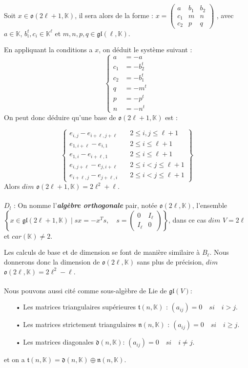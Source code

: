 \documentclass[a4paper,openany,12pt]{report}
\newcommand{\KK}{\mathbb{K}}
\newcommand{\gl}{\mathfrak{gl}}
\newcommand{\ttt}{\mathfrak{t}}
\newcommand{\nn}{\mathfrak{n}}
\newcommand{\dd}{\mathfrak{d}}
\newcommand{\oo}{\mathfrak{o}}
\theoremstyle{break}
{\theorembodyfont{\upshape}
\newtheorem*{rmq}{Remarque :}
\newtheorem*{prv}{Preuve :}
\newtheorem*{ex}{Exemples :}
\newtheorem*{exe}{Exemple : }
\newtheorem*{nota}{Notation :}
\newtheorem*{dem}{D\'emonstration :}}
\begin{document}
Soit $x \in \oo(2 \ell +1, \KK)$, il sera alors de la forme :
$x = 
\begin{pmatrix}
a & b_{1} & b_{2} \\
c_{1} & m & n \\
c_{2} & p & q 
\end{pmatrix} $
, avec $a \in \KK$, $b_{i}^t,c_{i} \in \KK^{\ell}$ et $m,n,p,q \in \gl(\ell,\KK)$.

En appliquant la conditions a $x$, on déduit le système suivant :
\[ \left \{
\begin{aligned}
a & = -a \\
c_{1} & = -b_{2}^t \\
c_{2} & = -b_{1}^t \\
q & = -m^t \\
p & = -p^t \\
n & = -n^t
\end{aligned}
\right. \]
On peut donc déduire qu'une base de $\oo(2\ell+1,\KK)$ est :

\[ \left \{
\begin{aligned}
e_{i,j}-e_{i+\ell,j+\ell } & \quad 2\leq i,j \leq \ell+1\\
e_{1,i+\ell}-e_{i,1} & \quad 2 \leq i \leq \ell+1 \\
e_{1,i}-e_{i+\ell,1} & \quad 2 \leq i \leq \ell+1 \\ 
e_{i,j+\ell}-e_{j,i+\ell} & \quad 2 \leq i < j \leq \ell+1\\
e_{i+\ell,j}-e_{j+\ell,i} & \quad 2 \leq i < j \leq \ell+1
\end{aligned}
\right \} \]
Alors $dim$ $\oo(2\ell+1,\KK)=2\ell^2+\ell$.\\
\\
$ D_{l} $ : On nomme l'\textbf{\emph{algèbre orthogonale}} pair, notée  $\oo (2\ell,\KK)$, l'ensemble $ \left \{ x \in \gl(2\ell+1, \KK) \mid sx= -x^Ts, \quad s =\begin{pmatrix} 0 & I_\ell \\ I_\ell & 0 \end{pmatrix} \right \}$, dans ce cas $dim$ $V=2 \ell$ et $car(\KK) \ne 2$.

Les calculs de base et de dimension se font de manière similaire à $B_{\ell}$. Nous donnerons donc la dimension de $\oo(2\ell,\KK)$ sans plus de précision, $dim$ $\oo(2\ell,\KK)=2\ell^2-\ell$.\\
\\
\quad Nous pouvons aussi cité comme sous-algèbre de Lie de $\gl(V)$:
\begin{itemize}
\item[•] Les matrices triangulaires supérieures $\ttt(n,\KK)$ : $(a_{ij})= 0  \quad si \quad i>j.$

\item[•] Les matrices strictement  triangulaires  $ \nn(n,\KK) $ : $(a_{ij})= 0  \quad si \quad i \geq j.$

\item[•] Les matrices diagonales $\dd(n,\KK)$: $(a_{ij})= 0  \quad si \quad i \ne j .$
\end{itemize}
et on a $\ttt(n,\KK)=\dd(n,\KK) \oplus \nn(n,\KK)$.
\end{document}
